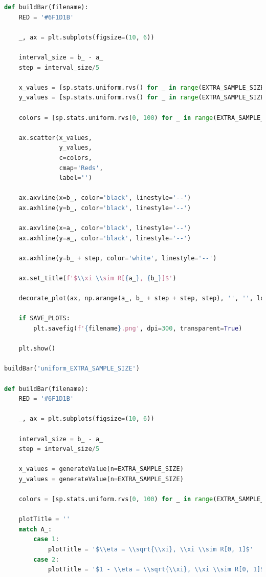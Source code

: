 \documentclass[a4paper, 14pt]{extarticle}
\begin{document}
\begin{center}
\begin{lstlisting}[language=Python]
def buildBar(filename):
    RED = '#6F1D1B'

    _, ax = plt.subplots(figsize=(10, 6))

    interval_size = b_ - a_
    step = interval_size/5

    x_values = [sp.stats.uniform.rvs() for _ in range(EXTRA_SAMPLE_SIZE)]
    y_values = [sp.stats.uniform.rvs() for _ in range(EXTRA_SAMPLE_SIZE)]

    colors = [sp.stats.uniform.rvs(0, 100) for _ in range(EXTRA_SAMPLE_SIZE)]

    ax.scatter(x_values, 
               y_values, 
               c=colors, 
               cmap='Reds',
               label='')

    ax.axvline(x=b_, color='black', linestyle='--')
    ax.axhline(y=b_, color='black', linestyle='--')

    ax.axvline(x=a_, color='black', linestyle='--')
    ax.axhline(y=a_, color='black', linestyle='--')

    ax.axhline(y=b_ + step, color='white', linestyle='--')

    ax.set_title(f'$\\xi \\sim R[{a_}, {b_}]$')

    decorate_plot(ax, np.arange(a_, b_ + step + step, step), '', '', loc='best')

    if SAVE_PLOTS:
        plt.savefig(f'{filename}.png', dpi=300, transparent=True)

    plt.show()

buildBar('uniform_EXTRA_SAMPLE_SIZE')

def buildBar(filename):
    RED = '#6F1D1B'

    _, ax = plt.subplots(figsize=(10, 6))

    interval_size = b_ - a_
    step = interval_size/5

    x_values = generateValue(n=EXTRA_SAMPLE_SIZE)
    y_values = generateValue(n=EXTRA_SAMPLE_SIZE)

    colors = [sp.stats.uniform.rvs(0, 100) for _ in range(EXTRA_SAMPLE_SIZE)]

    plotTitle = ''
    match A_:
        case 1:
            plotTitle = '$\\eta = \\sqrt{\\xi}, \\xi \\sim R[0, 1]$'
        case 2:
            plotTitle = '$1 - \\eta = \\sqrt{\\xi}, \\xi \\sim R[0, 1]$'


\end{lstlisting}
\end{center}
\end{document}

